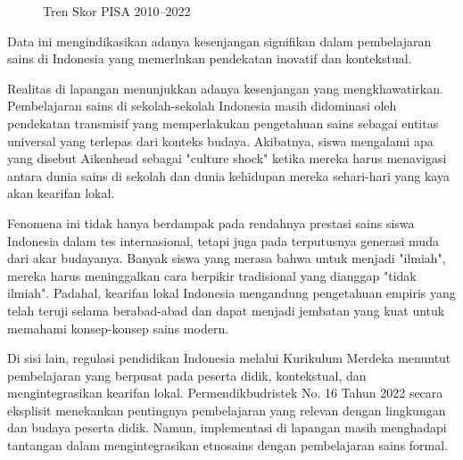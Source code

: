 \documentclass[12pt,a4paper,oneside]{book}
\begin{document}
\begin{figure}[H]
  \centering
  \caption{Tren Skor PISA 2010–2022}
  \label{fig:pisa_trend}
\end{figure}

Data ini mengindikasikan adanya kesenjangan signifikan dalam pembelajaran sains di Indonesia yang memerlukan pendekatan inovatif dan kontekstual.

Realitas di lapangan menunjukkan adanya kesenjangan yang mengkhawatirkan. Pembelajaran sains di sekolah-sekolah Indonesia masih didominasi oleh pendekatan transmisif yang memperlakukan pengetahuan sains sebagai entitas universal yang terlepas dari konteks budaya. Akibatnya, siswa mengalami apa yang disebut Aikenhead sebagai "culture shock" ketika mereka harus menavigasi antara dunia sains di sekolah dan dunia kehidupan mereka sehari-hari yang kaya akan kearifan lokal.

Fenomena ini tidak hanya berdampak pada rendahnya prestasi sains siswa Indonesia dalam tes internasional, tetapi juga pada terputusnya generasi muda dari akar budayanya. Banyak siswa yang merasa bahwa untuk menjadi "ilmiah", mereka harus meninggalkan cara berpikir tradisional yang dianggap "tidak ilmiah". Padahal, kearifan lokal Indonesia mengandung pengetahuan empiris yang telah teruji selama berabad-abad dan dapat menjadi jembatan yang kuat untuk memahami konsep-konsep sains modern.

Di sisi lain, regulasi pendidikan Indonesia melalui Kurikulum Merdeka menuntut pembelajaran yang berpusat pada peserta didik, kontekstual, dan mengintegrasikan kearifan lokal. Permendikbudristek No. 16 Tahun 2022 secara eksplisit menekankan pentingnya pembelajaran yang relevan dengan lingkungan dan budaya peserta didik. Namun, implementasi di lapangan masih menghadapi tantangan dalam mengintegrasikan etnosains dengan pembelajaran sains formal.
\end{document}
